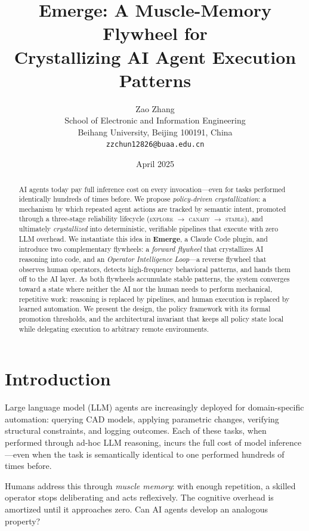 \documentclass[11pt,a4paper]{article}
\title{\textbf{Emerge: A Muscle-Memory Flywheel for\\[4pt]
       Crystallizing AI Agent Execution Patterns}}
\author{
  Zao Zhang \\[2pt]
  School of Electronic and Information Engineering \\
  Beihang University, Beijing 100191, China \\[2pt]
  \texttt{zzchun12826@buaa.edu.cn}
}
\date{April 2025}
\begin{document}
\maketitle
\thispagestyle{empty}

\begin{abstract}
AI agents today pay full inference cost on every invocation---even for tasks performed identically hundreds
of times before.
We propose \emph{policy-driven crystallization}: a mechanism by which repeated agent actions are tracked by
semantic intent, promoted through a three-stage reliability lifecycle
(\textsc{explore} $\to$ \textsc{canary} $\to$ \textsc{stable}), and ultimately \emph{crystallized} into
deterministic, verifiable pipelines that execute with zero LLM overhead.
We instantiate this idea in \textbf{Emerge}, a Claude Code plugin, and introduce two complementary flywheels:
a \emph{forward flywheel} that crystallizes AI reasoning into code,
and an \emph{Operator Intelligence Loop}---a reverse flywheel that observes human operators,
detects high-frequency behavioral patterns, and hands them off to the AI layer.
As both flywheels accumulate stable patterns, the system converges toward a state where neither the AI
nor the human needs to perform mechanical, repetitive work:
reasoning is replaced by pipelines, and human execution is replaced by learned automation.
We present the design, the policy framework with its formal promotion thresholds,
and the architectural invariant that keeps all policy state local while delegating execution to
arbitrary remote environments.
\end{abstract}

\section{Introduction}

Large language model (LLM) agents are increasingly deployed for domain-specific automation:
querying CAD models, applying parametric changes, verifying structural constraints, and logging outcomes.
Each of these tasks, when performed through ad-hoc LLM reasoning, incurs the full cost of model inference---even
when the task is semantically identical to one performed hundreds of times before.

Humans address this through \emph{muscle memory}: with enough repetition, a skilled operator stops deliberating
and acts reflexively. The cognitive overhead is amortized until it approaches zero.
Can AI agents develop an analogous property?
\end{document}

